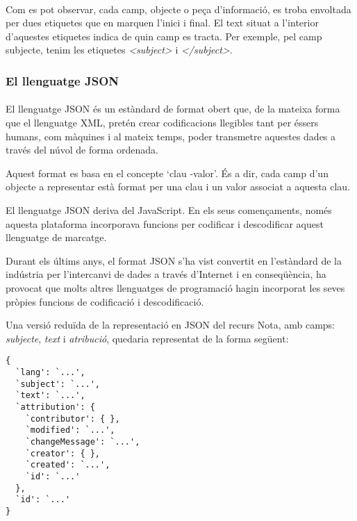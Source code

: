         \paragraph{}
        Com es pot observar, cada camp, objecte o peça d'informació, es troba envoltada per dues etiquetes que en marquen l'inici i final. El text situat a l'interior d'aquestes etiquetes indica de quin camp es tracta. Per exemple, pel camp subjecte, tenim les etiquetes \emph{<subject>} i \emph{</subject>}.


        \subsubsection{El llenguatge JSON}

        \paragraph{}
        El llenguatge \gls{JSON} és un estàndard de format obert que, de la mateixa forma que el llenguatge XML, pretén crear codificacions llegibles tant per éssers humans, com màquines i al mateix temps, poder transmetre aquestes dades a través del núvol de forma ordenada.

        Aquest format es basa en el concepte `clau -valor'. És a dir, cada camp d'un objecte a representar està format per una clau i un valor associat a aquesta clau.

        El llenguatge JSON deriva del JavaScript. En els seus començaments, només aquesta plataforma incorporava funcions per codificar i descodificar aquest llenguatge de marcatge.

        Durant els últims anys, el format JSON s'ha vist convertit en l'estàndard de la indústria per l'intercanvi de dades a través d'Internet i en conseqüència, ha provocat que molts altres llenguatges de programació hagin incorporat les seves pròpies funcions de codificació i descodificació.

        Una versió reduïda de la representació en JSON del recurs Nota, amb camps: \emph{subjecte}, \emph{text} i \emph{atribució}, quedaria representat de la forma següent:

        \begin{lstlisting}[style=rawOwn,caption={Representació bàsica en JSON d'una Nota}]
{
  `lang': `...',
  `subject': `...',
  `text': `...',
  `attribution': {
    `contributor': { },
    `modified': `...',
    `changeMessage': `...',
    `creator': { },
    `created': `...',
    `id': `...'
  },
  `id': `...'
}
        \end{lstlisting}
